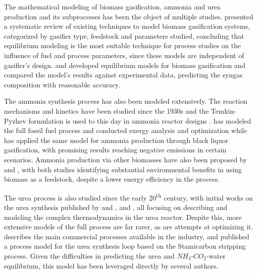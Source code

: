 \documentclass[a4paper, titlepage]{article}
\begin{document}
The mathematical modeling of biomass gasification, ammonia and urea production and its subprocesses has been the object
of multiple studies. \textcite{baruahModelingBiomassGasification2014} presented a systematic review of existing
techniques to model biomass gasification systems, categorized by gasifier type, feedstock and parameters studied,
concluding that equilibrium modeling is the most suitable technique for process studies on the influence of fuel and
process parameters, since these models are independent of gasifier's design.
\textcite{gambarottaNonstoichiometricEquilibriumModel2018} and \textcite{azzoneDevelopmentEquilibriumModel2012}
developed equilibrium models for biomass gasification and compared the model’s results against experimental data,
predicting the syngas composition with reasonable accuracy.

The ammonia synthesis process has also been modeled extensively. The reaction mechanisms and kinetics have been
studied since the 1930s \cite{gillespieThermodynamicTreatmentChemical1930} and the Temkin-Pyzhev formulation is
used to this day in ammonia reactor designs \cite{temkinKineticsAmmoniaSynthesis1940}
\cite{singhSimulationAmmoniaSynthesis1979} \cite{nielsenAmmoniaCatalysisManufacture1995}.
\textcite{florez-orregoProcessSynthesisOptimization2018} has modeled the full fossil fuel process and conducted
exergy analysis and optimization while \textcite{domingosExergyEnvironmentalAnalysis2021} has applied the same model
for ammonia production through black liquor gasification, with promising results reaching negative emissions in
certain scenarios. Ammonia production via other biomasses have also been proposed by
\textcite{florez-orregoComparativeExergyEconomic2019} and \textcite{tunaTechnoeconomicAssessmentNonfossil2014}, with
both studies identifying substantial environmental benefits in using biomass as a feedstock, despite a lower energy
efficiency in the process.

The urea process is also studied since the early 20\textsuperscript{th} century, with initial works on the
urea synthesis published by \textcite{frejacquesBasesTheoriquesSynthese1948} and
\textcite{kawasumiEquilibriumCO2NH3UreaH2OSystem1953}, and \textcite{islaSimulationUreaSynthesis1993}, all focusing
on describing and modeling the complex thermodynamics in the urea reactor. Despite this, more extensive models of
the full process are far rarer, as are attempts at optimizing it.
\textcite{meessenUreaSynthesis2014} describes the main commercial processes available in the industry, and
\textcite{aspentechASPEN88Technical2011} published a process model for the urea synthesis loop based on the
Stamicarbon stripping process. Given the difficulties in predicting the urea and $NH_3$-$CO_2$-water equilibrium, this
model has been leveraged directly by several authors.
\end{document}

